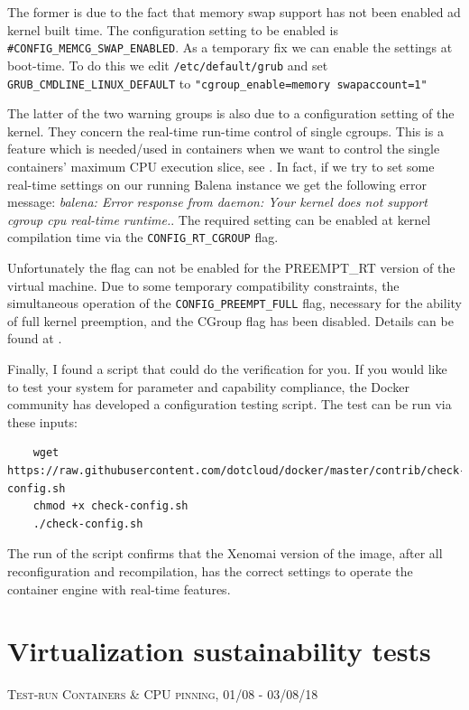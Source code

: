 \documentclass[]{scrartcl}
\begin{document}
The former is due to the fact that memory swap support has not been enabled ad kernel built time. 
The configuration setting to be enabled is \texttt{\#CONFIG\_MEMCG\_SWAP\_ENABLED}. As a temporary fix we can enable the settings at boot-time. 
To do this we edit \texttt{/etc/default/grub} and set 
\texttt{GRUB\_CMDLINE\_LINUX\_DEFAULT} to \texttt{"cgroup\_enable=memory swapaccount=1"}

The latter of the two warning groups is also due to a configuration setting of the kernel. They concern the real-time run-time control of single cgroups. This is a feature which is needed/used in containers when we want to control the single containers' maximum CPU execution slice, see \cite{docker04}. 
In fact, if we try to set some real-time settings on our running Balena instance we get the following error message: \textit{balena: Error response from daemon: Your kernel does not support cgroup cpu real-time runtime.}.
The required setting can be enabled at kernel compilation time via the \texttt{CONFIG\_RT\_CGROUP} flag. 

Unfortunately the flag can not be enabled for the PREEMPT\_RT version of the virtual machine. Due to some temporary compatibility constraints, the simultaneous operation of the \texttt{CONFIG\_PREEMPT\_FULL} flag, necessary for the ability of full kernel preemption, and the CGroup flag has been disabled. Details can be found at \cite{lfnd01}.

Finally, I found a script that could do the verification for you. If you would like to test your system for parameter and capability compliance, the Docker community has developed a configuration testing script. The test can be run via these inputs:

\begin{verbatim}
	wget https://raw.githubusercontent.com/dotcloud/docker/master/contrib/check-config.sh
	chmod +x check-config.sh
	./check-config.sh
\end{verbatim}

The run of the script confirms that the Xenomai version of the image, after all reconfiguration and recompilation, has the correct settings to operate the container engine with real-time features.

\section{Virtualization sustainability tests}
\label{sec:virtsust}
{\small\textsc{Test-run Containers \& CPU pinning, 01/08 - 03/08/18} \bigskip}
\end{document}
